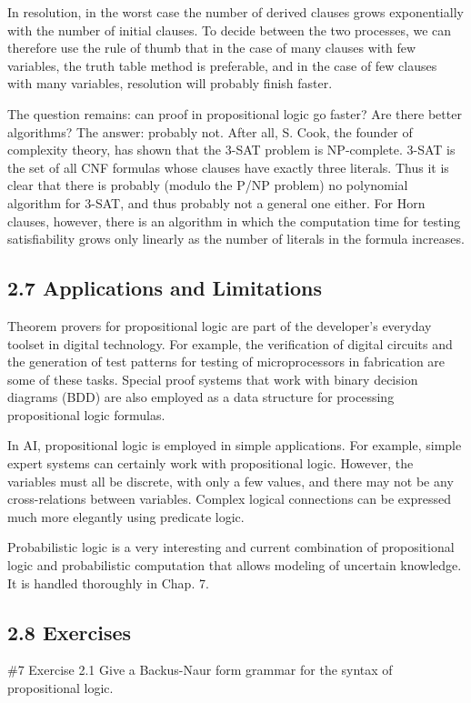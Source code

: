 \documentclass[10pt]{article}
\begin{document}
In resolution, in the worst case the number of derived clauses grows exponentially with the number of initial clauses. To decide between the two processes, we can therefore use the rule of thumb that in the case of many clauses with few variables, the truth table method is preferable, and in the case of few clauses with many variables, resolution will probably finish faster.

The question remains: can proof in propositional logic go faster? Are there better algorithms? The answer: probably not. After all, S. Cook, the founder of complexity theory, has shown that the 3-SAT problem is NP-complete. 3-SAT is the set of all CNF formulas whose clauses have exactly three literals. Thus it is clear that there is probably (modulo the P/NP problem) no polynomial algorithm for 3-SAT, and thus probably not a general one either. For Horn clauses, however, there is an algorithm in which the computation time for testing satisfiability grows only linearly as the number of literals in the formula increases.

\subsection*{2.7 Applications and Limitations}
Theorem provers for propositional logic are part of the developer's everyday toolset in digital technology. For example, the verification of digital circuits and the generation of test patterns for testing of microprocessors in fabrication are some of these tasks. Special proof systems that work with binary decision diagrams (BDD) are also employed as a data structure for processing propositional logic formulas.

In AI, propositional logic is employed in simple applications. For example, simple expert systems can certainly work with propositional logic. However, the variables must all be discrete, with only a few values, and there may not be any cross-relations between variables. Complex logical connections can be expressed much more elegantly using predicate logic.

Probabilistic logic is a very interesting and current combination of propositional logic and probabilistic computation that allows modeling of uncertain knowledge. It is handled thoroughly in Chap. 7.

\subsection*{2.8 Exercises}
\#7 Exercise 2.1 Give a Backus-Naur form grammar for the syntax of propositional logic.
\end{document}
